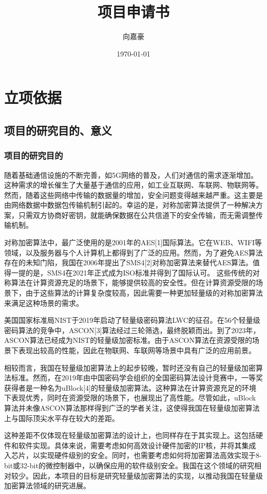 \documentclass{ctexart}
\begin{document}
\title{项目申请书}
\author{向嘉豪}
\date{\today}

\maketitle


\section{立项依据}
\subsection{项目的研究目的、意义}

\subsubsection{项目的研究目的}
随着基础通信设施的不断完善，如5G网络的普及，人们对通信的需求逐渐增加。这种需求的增长催生了大量基于通信的应用，如工业互联网、车联网、物联网等。
然而，随着这些网络中传输的数据量的增加，安全问题变得越来越严重。这主要是由网络数据中数据包传输机制引起的。幸运的是，对称加密算法提供了一种解决方案，只需双方协商好密钥，就能确保数据在公共信道下的安全传输，而无需调整传输机制。 

对称加密算法中，最广泛使用的是2001年的AES[1]国际算法。它在WEB、WIFI等领域，以及服务器与个人计算机上都得到了广泛的应用。然而，为了避免AES算法存在的未知门陷，我国在2006年提出了SMS4[2]对称加密算法来替代AES算法。值得一提的是，SMS4在2021年正式成为ISO标准并得到了国际认可。
这些传统的对称算法在计算资源充足的场景下，能够提供较高的安全性。但在计算资源受限的场景下，由于这些算法的计算复杂度较高，因此需要一种更加轻量级的对称加密算法来满足这种场景的需求。

美国国家标准局NIST于2019年启动了轻量级密码算法LWC的征召。在56个轻量级密码算法的竞争中，ASCON[3]算法经过三轮筛选，最终脱颖而出。到了2023年，ASCON算法已经成为NIST的轻量级加密标准。由于ASCON算法在资源受限的场景下表现出较高的性能，因此在物联网、车联网等场景中具有广泛的应用前景。

相较而言，我国在轻量级加密算法上的起步较晚，暂时还没有自己的轻量级加密算法标准。然而，在2019年由中国密码学会组织的全国密码算法设计竞赛中，一等奖获得者是一种名为uBlock[4]的轻量级加密算法。这种算法在计算资源充足的环境下表现优秀，同时在资源受限的场景下，也展现出了高性能。尽管如此，uBlock算法并未像ASCON算法那样得到广泛的学者关注，这使得我国在轻量级加密算法上与国际顶尖水平存在较大的差距。

这种差距不仅体现在轻量级加密算法的设计上，也同样存在于其实现上。这包括硬件和软件实现。具体来说，需要考虑如何高效设计硬件加密的IP核，并将其集成入芯片，以实现硬件级别的安全。同时，也需要考虑如何将加密算法高效实现于8-bit或32-bit的微控制器中，以确保应用的软件级别安全。我国在这个领域的研究相对较少。因此，本项目的目标是研究轻量级加密算法的实现，以推动我国在轻量级加密算法领域的研究进展。
\end{document}
